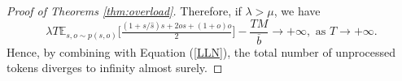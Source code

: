 \documentclass{article}
\theoremstyle{plain}
\newtheorem{theorem}{Theorem}[section]
\theoremstyle{definition}
\theoremstyle{remark}
\begin{document}
\begin{proof}[Proof of Theorems \ref{thm:overload}]
Therefore, if \(\lambda>\mu\), we have 
\[
\lambda T\mathbb{E}_{s,o\sim p(s,o)}\Big[\tfrac{(1+s/\hat{s})s+2os+(1+o)o}{2}\Big] - \frac{TM}{\,\overline{b}\,}\rightarrow +\infty, \text{ as }T \rightarrow +\infty.
\]
Hence, by combining with Equation (\ref{LLN}), the total number of unprocessed tokens diverges to infinity almost surely.

\end{proof}




\end{document}
